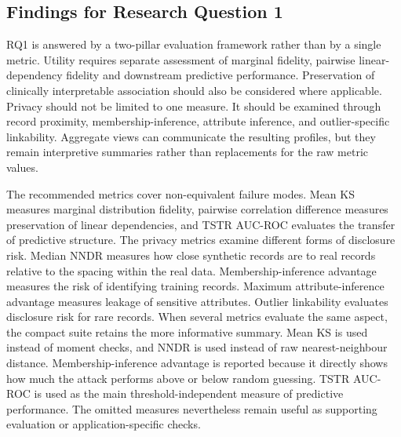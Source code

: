 \subsection*{Findings for Research Question 1}
\label{sec:results:rq1:answer}

RQ1 is answered by a two-pillar evaluation framework rather than by a
single metric. Utility requires separate assessment of marginal
fidelity, pairwise linear-dependency fidelity and downstream predictive
performance. Preservation of clinically interpretable association
should also be considered where applicable. 
Privacy should not be limited to one measure. It should be
examined through record proximity, membership-inference, attribute
inference, and outlier-specific linkability. Aggregate views can
communicate the resulting profiles, but they remain interpretive
summaries rather than replacements for the raw metric values.

The recommended metrics cover non-equivalent failure modes. 
Mean KS measures marginal distribution fidelity, pairwise 
correlation difference measures preservation of linear 
dependencies, and TSTR AUC-ROC evaluates the transfer of predictive 
structure. The privacy metrics examine different forms of disclosure risk. Median
NNDR measures how close synthetic records are to real records relative to
the spacing within the real data. Membership-inference advantage measures
the risk of identifying training records. Maximum attribute-inference
advantage measures leakage of sensitive attributes. Outlier linkability
evaluates disclosure risk for rare records. When several 
metrics evaluate the same aspect, the compact suite retains
the more informative summary. Mean KS is used instead of moment checks,
and NNDR is used instead of raw nearest-neighbour distance. 
Membership-inference advantage is reported because it directly shows how
much the attack performs above or below random guessing. TSTR AUC-ROC is used as the main
threshold-independent measure of predictive performance. The omitted 
measures nevertheless remain useful as supporting evaluation 
or application-specific checks.

